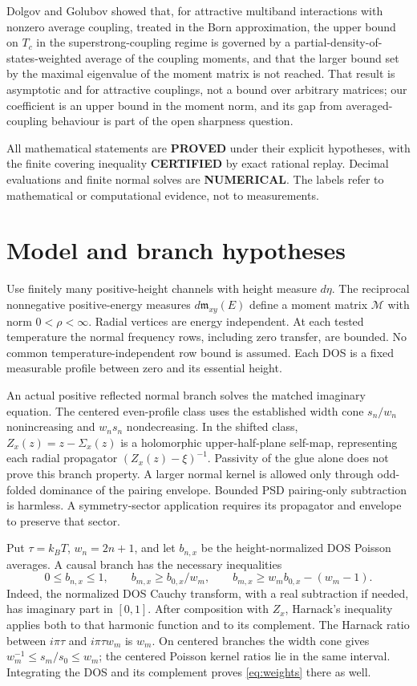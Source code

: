 \documentclass[11pt]{article}
\begin{document}
Dolgov and Golubov \cite{dolgov} showed that, for attractive multiband interactions with nonzero average coupling, treated in the Born approximation, the upper bound on $T_c$ in the superstrong-coupling regime is governed by a partial-density-of-states-weighted average of the coupling moments, and that the larger bound set by the maximal eigenvalue of the moment matrix is not reached. That result is asymptotic and for attractive couplings, not a bound over arbitrary matrices; our coefficient is an upper bound in the moment norm, and its gap from averaged-coupling behaviour is part of the open sharpness question.

All mathematical statements are \textbf{PROVED} under their explicit hypotheses, with the finite covering inequality \textbf{CERTIFIED} by exact rational replay. Decimal evaluations and finite normal solves are \textbf{NUMERICAL}. The labels refer to mathematical or computational evidence, not to measurements.

\section{Model and branch hypotheses}
Use finitely many positive-height channels with height measure $d\eta$. The reciprocal nonnegative positive-energy measures $d\mathfrak m_{xy}(E)$ define a moment matrix $\mathcal M$ with norm $0<\rho<\infty$. Radial vertices are energy independent. At each tested temperature the normal frequency rows, including zero transfer, are bounded. No common temperature-independent row bound is assumed. Each DOS is a fixed measurable profile between zero and its essential height.

An actual positive reflected normal branch solves the matched imaginary equation. The centered even-profile class uses the established width cone $s_n/w_n$ nonincreasing and $w_ns_n$ nondecreasing. In the shifted class, $Z_x(z)=z-\Sigma_x(z)$ is a holomorphic upper-half-plane self-map, representing each radial propagator $(Z_x(z)-\xi)^{-1}$. Passivity of the glue alone does not prove this branch property. A larger normal kernel is allowed only through odd-folded dominance of the pairing envelope. Bounded PSD pairing-only subtraction is harmless. A symmetry-sector application requires its propagator and envelope to preserve that sector.

Put $\tau=k_BT$, $w_n=2n+1$, and let $b_{n,x}$ be the height-normalized DOS Poisson averages. A causal branch has the necessary inequalities
\begin{equation}
 0\le b_{n,x}\le1,\qquad
 b_{m,x}\ge b_{0,x}/w_m,\qquad
 b_{m,x}\ge w_mb_{0,x}-(w_m-1).\label{eq:weights}
\end{equation}
Indeed, the normalized DOS Cauchy transform, with a real subtraction if needed, has imaginary part in $[0,1]$. After composition with $Z_x$, Harnack's inequality applies both to that harmonic function and to its complement. The Harnack ratio between $i\pi\tau$ and $i\pi\tau w_m$ is $w_m$. On centered branches the width cone gives $w_m^{-1}\le s_m/s_0\le w_m$; the centered Poisson kernel ratios lie in the same interval. Integrating the DOS and its complement proves \eqref{eq:weights} there as well.
\end{document}
